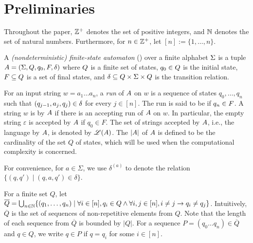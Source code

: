 \section{Preliminaries}

Throughout the paper, $\mathbb{Z}^+$ denotes the set of positive integers, and  $\mathbb{N}$ denotes the set of natural numbers. Furthermore, for $n\in \mathbb{Z}^+$, let $[n]:=\{1, \ldots, n\}$. 

\begin{definition} \label{def:nfa}
	A \emph{(nondeterministic) finite-state automaton}
	(\FA{}) over a finite alphabet $\Sigma$ is a tuple ${A} =
	(\Sigma, Q, q_0, F, \delta)$ where 
	$Q$ is a finite set of 
	states, $q_0\in Q$ is
	the initial state, $F\subseteq Q$ is a set of final states, and 
	$\delta\subseteq Q \times 
	\Sigma \times  Q$ is the
	transition relation. 
\end{definition}

For an input string $w=a_1 \dots a_n$, a \emph{run} of ${A}$ on $w$
is a sequence of states $q_0, \ldots, q_n$ such that $(q_{j-1}, a_{j}, q_{j}) \in
\delta$  for every $j \in [n]$.
The run is said to be  if $q_n \in F$.
A string $w$ is  by ${A}$ if there is an accepting run of
${A}$ on $w$. In particular, the empty string $\varepsilon$ is accepted by ${A}$ if $q_0 \in F$. The set of strings accepted by ${A}$, i.e., the language  by ${A}$, is denoted by $\mathscr{L}({A})$.
The  $|{A}|$ of ${A}$ is defined to be the cardinality of the set $Q$ of states, which will be 
used when the computational complexity is concerned.

For convenience, for $a \in \Sigma$, we use $\delta^{(a)}$ to denote the  relation $\{(q, q') \mid (q, a, q') \in \delta\}$.

For a finite set $Q$, let $\overline{Q} = \bigcup_{n\in \mathbb{N}}\{ (q_1, \ldots, q_n) \mid \forall i \in [n], q_i \in Q \wedge \forall i,j \in[n], i \neq j \rightarrow q_i \neq q_j \}$. Intuitively, $\overline{Q}$ is the set of sequences of non-repetitive elements from $Q$. Note that the length of each sequence from $\overline{Q}$ is bounded by  $| Q |$. For a sequence $P = (q_0 \ldots q_n) \in \overline{Q}$ and  $q \in Q$, we write $q \in P$ if  $q = q_i$ for some $i \in [n]$. 

